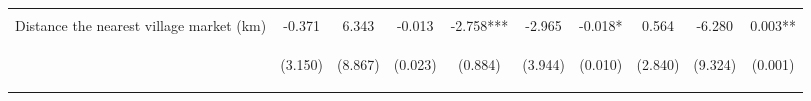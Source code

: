 \begin{center}
\begin{tabular}{lccccccccc}
\vspace{4pt} & \begin{footnotesize}[0.275]\end{footnotesize} & \begin{footnotesize}[0.573]\end{footnotesize} & \begin{footnotesize}[0.000]\end{footnotesize} & \begin{footnotesize}[0.880]\end{footnotesize} & \begin{footnotesize}[0.189]\end{footnotesize} & \begin{footnotesize}[0.001]\end{footnotesize} & \begin{footnotesize}[0.940]\end{footnotesize} & \begin{footnotesize}[0.624]\end{footnotesize} & \begin{footnotesize}[0.031]\end{footnotesize} \\
Distance the nearest village market (km) & -0.371 & 6.343 & -0.013 & -2.758*** & -2.965 & -0.018* & 0.564 & -6.280 & 0.003** \\
 & \begin{footnotesize}(3.150)\end{footnotesize} & \begin{footnotesize}(8.867)\end{footnotesize} & \begin{footnotesize}(0.023)\end{footnotesize} & \begin{footnotesize}(0.884)\end{footnotesize} & \begin{footnotesize}(3.944)\end{footnotesize} & \begin{footnotesize}(0.010)\end{footnotesize} & \begin{footnotesize}(2.840)\end{footnotesize} & \begin{footnotesize}(9.324)\end{footnotesize} & \begin{footnotesize}(0.001)\end{footnotesize} \\

\end{tabular}
\end{center}
